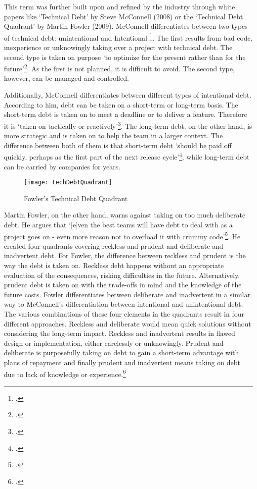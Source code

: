 This term was further built upon and refined by the industry through white papers like `Technical Debt' by Steve McConnell (2008) or the `Technical Debt Quadrant' by Martin Fowler (2009).
McConnell differentiates between two types of technical debt: unintentional and Intentional \footcite[3]{mcconnellManagingTechnicalDebt2017}. The first results from bad code, inexperience or unknowingly taking over a project with technical debt.
The second type is taken on purpose `to optimize for the present rather than for the future'\footcite[3]{mcconnellManagingTechnicalDebt2017}. As the first is not planned, it is difficult to avoid. The second type, however, can be managed and controlled.

Additionally, McConnell differentiates between different types of intentional debt. According to him, debt can be taken on a short-term or long-term basis. The short-term debt is taken on to meet a deadline or to deliver a feature. Therefore it is `taken on tactically or reactively'\footcite[3]{mcconnellManagingTechnicalDebt2017}.
The long-term debt, on the other hand, is more strategic and is taken on to help the team in a larger context. The difference between both of them is that short-term debt `should be paid off quickly, perhaps as the first part of the next release cycle'\footcite[4]{mcconnellManagingTechnicalDebt2017}, while 
long-term debt can be carried by companies for years.

\begin{figure}[H]
    \centering
    \caption{Fowler's Technical Debt Quadrant}
    \label{fig:technicaldebtquadrant}
    \texttt{[image: techDebtQuadrant]}
    \\
    \cite{fowlerTechnicalDebtQuadrant2009}
\end{figure}
Martin Fowler, on the other hand, warns against taking on too much deliberate debt. He argues that `[e]ven the best teams will have debt to deal with as a project goes on - even more reason not to overload it with crummy code'\footcite[no page number]{fowlerTechnicalDebtQuadrant2009}.
He created four quadrants covering reckless and prudent and deliberate and inadvertent debt. For Fowler, the difference between reckless and prudent is the way the debt is taken on. Reckless debt happens without an appropriate evaluation of the consequences, risking difficulties in the future. Alternatively, prudent debt is taken on
with the trade-offs in mind and the knowledge of the future costs. Fowler differentiates between deliberate and inadvertent in a similar way to McConnell's differentiation between intentional and unintentional debt.
The various combinations of these four elements in the quadrants result in four different approaches. Reckless and deliberate would mean quick solutions without considering the long-term impact. Reckless and inadvertent results in flawed design or implementation, either carelessly or unknowingly. 
Prudent and deliberate is purposefully taking on debt to gain a short-term advantage with plans of repayment and finally prudent and inadvertent means taking on debt due to lack of knowledge or experience.\footcite[no page number]{fowlerTechnicalDebtQuadrant2009}

